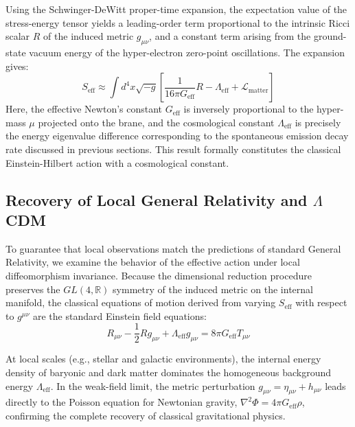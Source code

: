 Using the Schwinger-DeWitt proper-time expansion, the expectation value of the stress-energy tensor yields a leading-order term proportional to the intrinsic Ricci scalar $R$ of the induced metric $g_{\mu\nu}$, and a constant term arising from the ground-state vacuum energy of the hyper-electron zero-point oscillations. The expansion gives:
\begin{equation}
S_{\text{eff}} \approx \int d^4x \sqrt{-g} \left[ \frac{1}{16\pi G_{\text{eff}}} R - \Lambda_{\text{eff}} + \mathcal{L}_{\text{matter}} \right]
\end{equation}
Here, the effective Newton's constant $G_{\text{eff}}$ is inversely proportional to the hyper-mass $\mu$ projected onto the brane, and the cosmological constant $\Lambda_{\text{eff}}$ is precisely the energy eigenvalue difference corresponding to the spontaneous emission decay rate discussed in previous sections. This result formally constitutes the classical Einstein-Hilbert action with a cosmological constant.

\subsection{Recovery of Local General Relativity and $\Lambda$CDM}

To guarantee that local observations match the predictions of standard General Relativity, we examine the behavior of the effective action under local diffeomorphism invariance. Because the dimensional reduction procedure preserves the $GL(4, \mathbb{R})$ symmetry of the induced metric on the internal manifold, the classical equations of motion derived from varying $S_{\text{eff}}$ with respect to $g^{\mu\nu}$ are the standard Einstein field equations:
\begin{equation}
R_{\mu\nu} - \frac{1}{2} R g_{\mu\nu} + \Lambda_{\text{eff}} g_{\mu\nu} = 8\pi G_{\text{eff}} T_{\mu\nu}
\end{equation}

At local scales (e.g., stellar and galactic environments), the internal energy density of baryonic and dark matter dominates the homogeneous background energy $\Lambda_{\text{eff}}$. In the weak-field limit, the metric perturbation $g_{\mu\nu} = \eta_{\mu\nu} + h_{\mu\nu}$ leads directly to the Poisson equation for Newtonian gravity, $\nabla^2 \Phi = 4\pi G_{\text{eff}} \rho$, confirming the complete recovery of classical gravitational physics.

